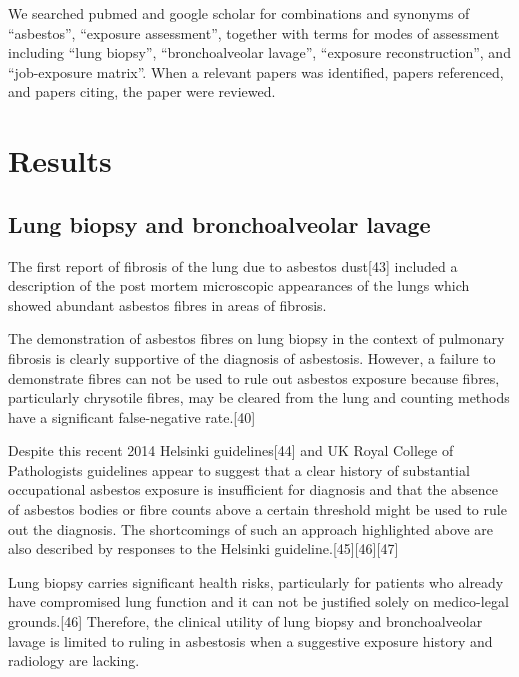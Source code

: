 \documentclass[12pt,a4paper,]{report}
\begin{document}
We searched pubmed and google scholar for combinations and synonyms of
``asbestos'', ``exposure assessment'', together with terms for modes of
assessment including ``lung biopsy'', ``bronchoalveolar lavage'',
``exposure reconstruction'', and ``job-exposure matrix''. When a
relevant papers was identified, papers referenced, and papers citing,
the paper were reviewed.

\hypertarget{results-2}{%
\section{Results}\label{results-2}}

\hypertarget{lung-biopsy-and-bronchoalveolar-lavage}{%
\subsection{Lung biopsy and bronchoalveolar
lavage}\label{lung-biopsy-and-bronchoalveolar-lavage}}

The first report of fibrosis of the lung due to asbestos dust{[}43{]}
included a description of the post mortem microscopic appearances of the
lungs which showed abundant asbestos fibres in areas of fibrosis.

The demonstration of asbestos fibres on lung biopsy in the context of
pulmonary fibrosis is clearly supportive of the diagnosis of asbestosis.
However, a failure to demonstrate fibres can not be used to rule out
asbestos exposure because fibres, particularly chrysotile fibres, may be
cleared from the lung and counting methods have a significant
false-negative rate.{[}40{]}

Despite this recent 2014 Helsinki guidelines{[}44{]} and UK Royal
College of Pathologists guidelines appear to suggest that a clear
history of substantial occupational asbestos exposure is insufficient
for diagnosis and that the absence of asbestos bodies or fibre counts
above a certain threshold might be used to rule out the diagnosis. The
shortcomings of such an approach highlighted above are also described by
responses to the Helsinki guideline.{[}45{]}{[}46{]}{[}47{]}

Lung biopsy carries significant health risks, particularly for patients
who already have compromised lung function and it can not be justified
solely on medico-legal grounds.{[}46{]} Therefore, the clinical utility
of lung biopsy and bronchoalveolar lavage is limited to ruling in
asbestosis when a suggestive exposure history and radiology are lacking.
\end{document}
